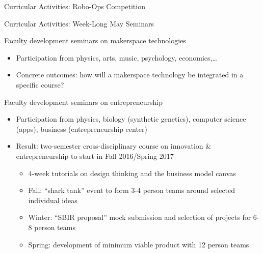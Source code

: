 \documentclass[xcolor=table,compress,professionalfonts,pdfpagelabels]{beamer}
\begin{document}
\begin{frame}{Curricular Activities: Robo-Ops Competition}
\end{frame}

\begin{frame}{Curricular Activities: Week-Long May Seminars}
 \begin{block}{Faculty development seminars on makerspace technologies}
  \begin{itemize}
   \item Participation from physics, arts, music, psychology, economics,\ldots
   \item Concrete outcomes: how will a makerspace technology be integrated in a specific course?
  \end{itemize}
 \end{block}
 \begin{block}{Faculty development seminars on entrepreneurship}
  \begin{itemize}
   \item Participation from physics, biology (synthetic genetics), computer science (apps), business (entrepreneurship center)
   \item Result: two-semester cross-disciplinary course on innovation \& entrepreneurship to start in Fall 2016/Spring 2017
    \begin{itemize}
     \item 4-week tutorials on design thinking and the business model canvas
     \item Fall: ``shark tank'' event to form 3-4 person teams around selected individual ideas
     \item Winter: ``SBIR proposal'' mock submission and selection of projects for 6-8 person teams
     \item Spring: development of minimum viable product with 12 person teams
    \end{itemize}
  \end{itemize}
 \end{block}
\end{frame}
\end{document}
